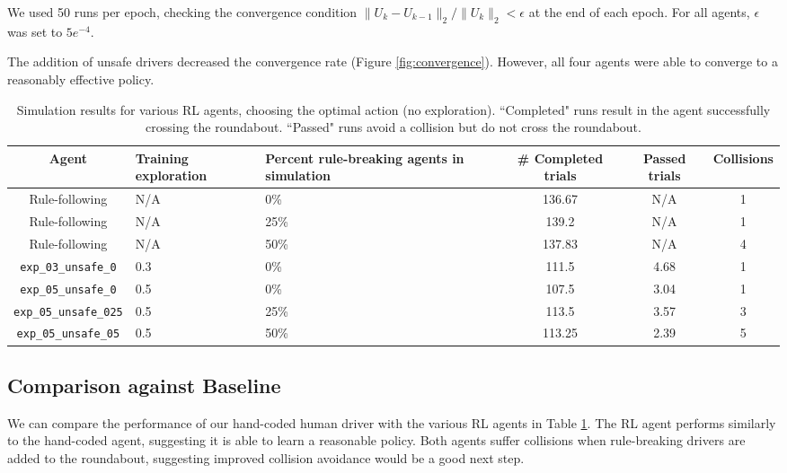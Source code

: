 \documentclass[conference]{IEEEtran}
\begin{document}
We used 50 runs per epoch, checking the convergence condition $\|U_k-U_{k-1}\|_2 / \|U_k\|_2 <\epsilon$ at the end of each epoch. For all agents, $\epsilon$ was set to $5e^{-4}$.

The addition of unsafe drivers decreased the convergence rate (Figure \ref{fig:convergence}). However, all four agents were able to converge to a reasonably effective policy.
\clearpage

\begin{table}[h!]
	\begin{minipage}{\textwidth}
		\centering
		\begin{tabular}{c|p{5em}p{9em}ccc}
			Agent & Training exploration & Percent rule-breaking agents in simulation & \# Completed trials & Passed trials & Collisions
			\\\hline
			Rule-following &N/A & 0\% & 136.67 & N/A & 1 \\
			Rule-following &N/A & 25\% & 139.2 & N/A & 1 \\
			Rule-following &N/A & 50\% & 137.83 & N/A &4\\
			\verb|exp_03_unsafe_0| &0.3 & 0\%& 111.5 & 4.68 & 1\\
			\verb|exp_05_unsafe_0| &0.5 &0\% &107.5 & 3.04 & 1 \\
			\verb|exp_05_unsafe_025| &0.5 &25\% & 113.5 & 3.57 & 3 \\
			\verb|exp_05_unsafe_05| &0.5 &50\%& 113.25 & 2.39 & 5 \\
		\end{tabular}
		\caption{Simulation results for various RL agents, choosing the optimal action (no exploration). ``Completed" runs result in the agent successfully crossing the roundabout. ``Passed" runs avoid a collision but do not cross the roundabout.}
		\label{tab:agent_results}
	\end{minipage}
\end{table}

\subsection*{Comparison against Baseline} We can compare the performance of our hand-coded human driver with the various RL agents in Table \ref{tab:agent_results}.
The RL agent performs similarly to the hand-coded agent, suggesting it is able to learn a reasonable policy. Both agents suffer collisions when rule-breaking drivers are added to the roundabout, suggesting improved collision avoidance would be a good next step.
\end{document}
